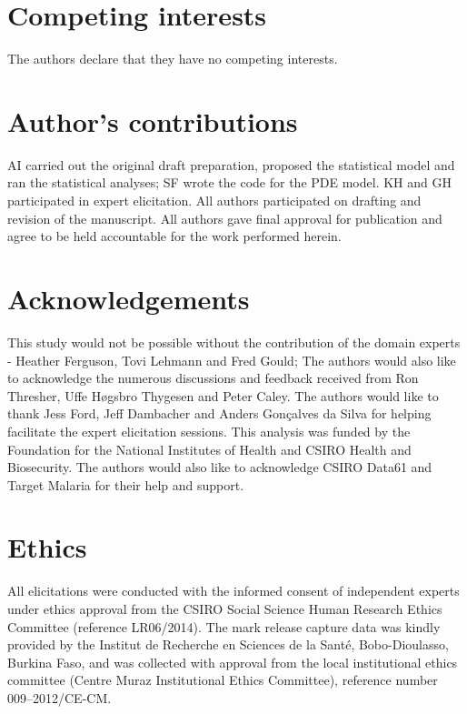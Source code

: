 \documentclass[]{bmcart}
\begin{document}
\begin{backmatter}

\section*{Competing interests}
  The authors declare that they have no competing interests.

\section*{Author's contributions}
AI carried out the original draft preparation, proposed the statistical model and ran the statistical analyses; SF wrote the code for the PDE model. KH and GH participated in expert elicitation. All authors participated on drafting and revision of the manuscript. All authors gave final approval for publication and 
agree to be held accountable for the work performed herein.

\section*{Acknowledgements}
 This study would not be possible without the contribution of the domain experts - Heather Ferguson, Tovi Lehmann and Fred Gould; The authors would also like to acknowledge the numerous discussions and feedback received from Ron Thresher, Uffe Høgsbro Thygesen and Peter Caley. The authors would like to thank Jess Ford, Jeff Dambacher and Anders Gonçalves da Silva for helping facilitate the expert elicitation sessions. This analysis was funded by the Foundation for the National Institutes of Health and CSIRO Health and Biosecurity. The authors would also like to acknowledge CSIRO Data61 and Target Malaria for their help and support.

\section*{Ethics}
All elicitations were conducted with the informed consent of independent experts under ethics approval from the CSIRO Social Science Human Research Ethics Committee (reference LR06/2014). The mark release capture data was kindly provided by the Institut de Recherche en Sciences de la Sant\'{e}, Bobo-Dioulasso, Burkina Faso, and was collected with approval from the local institutional ethics committee (Centre Muraz Institutional Ethics Committee), reference number 009–2012/CE-CM.


\end{backmatter}
\end{document}
